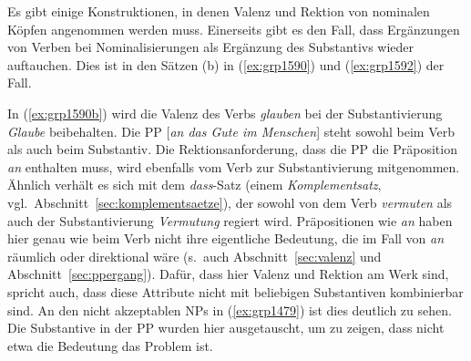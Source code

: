 \label{sec:rektioninderngr}


Es gibt einige Konstruktionen, in denen Valenz und Rektion von nominalen Köpfen angenommen werden muss.
Einerseits gibt es den Fall, dass Ergänzungen von Verben bei Nominalisierungen als Ergänzung des Substantivs wieder auftauchen.
Dies ist in den Sätzen (b) in (\ref{ex:grp1590}) und (\ref{ex:grp1592}) der Fall.

\begin{exe}
  \ex\label{ex:grp1590}
  \begin{xlist}
  \end{xlist}
  \ex\label{ex:grp1592}
  \begin{xlist}
  \end{xlist}
\end{exe}

In (\ref{ex:grp1590b}) wird die Valenz des Verbs \textit{glauben} bei der Substantivierung \textit{Glaube} beibehalten.
Die PP [\textit{an das Gute im Menschen}] steht sowohl beim Verb als auch beim Substantiv.
Die Rektionsanforderung, dass die PP die Präposition \textit{an} enthalten muss, wird ebenfalls vom Verb zur Substantivierung mitgenommen.
Ähnlich verhält es sich mit dem \textit{dass}-Satz (einem \textit{Komplementsatz}, vgl.\ Abschnitt~\ref{sec:komplementsaetze}), der sowohl von dem Verb \textit{vermuten} als auch der Substantivierung \textit{Vermutung} regiert wird.
Präpositionen wie \textit{an} haben hier genau wie beim Verb nicht ihre eigentliche Bedeutung, die im Fall von \textit{an} räumlich oder direktional wäre (s.\ auch Abschnitt~\ref{sec:valenz} und Abschnitt~\ref{sec:ppergang}).
Dafür, dass hier Valenz und Rektion am Werk sind, spricht auch, dass diese Attribute nicht mit beliebigen Substantiven kombinierbar sind.
An den nicht akzeptablen NPs in (\ref{ex:grp1479}) ist dies deutlich zu sehen.
Die Substantive in der PP wurden hier ausgetauscht, um zu zeigen, dass nicht etwa die Bedeutung das Problem ist.

\begin{exe}
  \ex\label{ex:grp1479}
  \begin{xlist}
  \end{xlist}
\end{exe}

